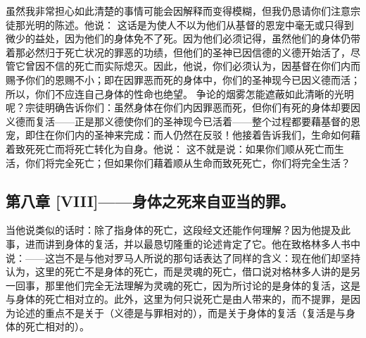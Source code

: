 虽然我非常担心如此清楚的事情可能会因解释而变得模糊，但我仍恳请你们注意宗徒那光明的陈述。他说： 这话是为使人不以为他们从基督的恩宠中毫无或只得到微少的益处，因为他们的身体免不了死。因为他们必须记得，虽然他们的身体仍带着那必然归于死亡状况的罪恶的功绩，但他们的圣神已因信德的义德开始活了，尽管它曾因不信的死亡而实际熄灭。因此，他说，你们必须认为，因基督在你们内而赐予你们的恩赐不小；即在因罪恶而死的身体中，你们的圣神现今已因义德而活；所以，你们不应连自己身体的性命也绝望。 争论的烟雾怎能遮蔽如此清晰的光明呢？宗徒明确告诉你们：虽然身体在你们内因罪恶而死，但你们有死的身体却要因义德而复活——正是那义德使你们的圣神现今已活着——整个过程都要藉基督的恩宠，即住在你们内的圣神来完成：而人仍然在反驳！他接着告诉我们，生命如何藉着致死死亡而将死亡转化为自身。他说： 这不就是说：如果你们顺从死亡而生活，你们将完全死亡；但如果你们藉着顺从生命而致死死亡，你们将完全生活？\par


\subsection{第八章 [VIII]——身体之死来自亚当的罪。}

当他说类似的话时：除了指身体的死亡，这段经文还能作何理解？因为他提及此事，进而讲到身体的复活，并以最恳切隆重的论述肯定了它。他在致格林多人书中说：——这岂不是与他对罗马人所说的那句话表达了同样的含义：现在他们却坚持认为，这里的死亡不是身体的死亡，而是灵魂的死亡，借口说对格林多人讲的是另一回事，那里他们完全无法理解为灵魂的死亡，因为所讨论的是身体的复活，这是与身体的死亡相对立的。此外，这里为何只说死亡是由人带来的，而不提罪，是因为论述的重点不是关于（义德是与罪相对的），而是关于身体的复活（复活是与身体的死亡相对的）。\par


